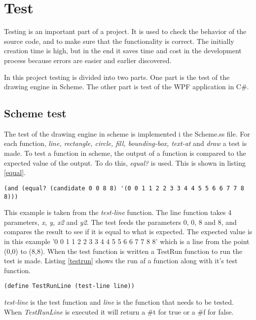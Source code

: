 \chapter{Test}
\label{chp:test}

Testing is an important part of a project. It is used to check the behavior of the source code, and to make sure that the functionality is correct. The initially creation time is high, but in the end it saves time and cost in the development process because errors are easier and earlier discovered.

In this project testing is divided into two parts. One part is the test of the drawing engine in Scheme. The other part is test of the WPF application in C\#.

\section{Scheme test}
The test of the drawing engine in scheme  is implemented i the Scheme.ss file. For each function, \emph{line, rectangle, circle, fill, bounding-box, text-at} and \emph{draw} a test is made. To test a function in scheme, the output of a function is compared to the expected value of the output. To do this, \emph{equal?} is used. This is shown in listing \ref{equal}.

\begin{lstlisting}[caption={Comparison of actual output with the expected output with equal?}, label=equal]
(and (equal? (candidate 0 0 8 8) '(0 0 1 1 2 2 3 3 4 4 5 5 6 6 7 7 8 8)))
\end{lstlisting}

This example is taken from the \emph{test-line} function. The line function takes 4 parameters, \emph{x, y, x2} and \emph{y2}. The test feeds the parameters 0, 0, 8 and 8, and compares the result to see if it is equal to what is expected. The expected value is in this example '0 0 1 1 2 2 3 3 4 4 5 5 6 6 7 7 8 8' which is a line from the point (0,0) to (8,8). When the test function is written a TestRun function to run the test is made. Listing \ref{testrun} shows the run af a function along with it's test function. 

\begin{lstlisting}[caption={TestRunLine}, label=testrun]
(define TestRunLine (test-line line))
\end{lstlisting}

\emph{test-line} is the test function and \emph{line} is the function that needs to be tested. When \emph{TestRunLine} is executed it will return a \#t for true or a \#f for false.

